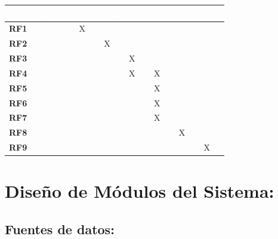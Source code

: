 \documentclass[12pt,a4paper]{article}
\begin{document}
                    \begin{table}[H]
                        \centering
                        \begin{tabularx}{\textwidth}{|X|p{1cm}|p{1cm}|p{1cm}|p{1cm}|p{1cm}|p{1cm}|}
                            \hline
                            \rowcolor{black} 
                            \textcolor{white}{Requerimiento} & \textcolor{white}{M.1} & \textcolor{white}{M.2} & \textcolor{white}{M.3} & \textcolor{white}{M.4} & \textcolor{white}{M.5} & \textcolor{white}{M.6}  \\ \hline
                            
                            \textbf{RF1} & X & & & & & \\ \hline
                            \textbf{RF2} & & X & & & & \\ \hline
                            \textbf{RF3} & & & X & & & \\ \hline
                            \textbf{RF4} & & & X & X & &  \\ \hline
                            \textbf{RF5} & & & & X & & \\ \hline
                            \textbf{RF6} & & & & X & & \\ \hline
                            \textbf{RF7} & & & & X &  & \\ \hline
                            \textbf{RF8} & & & &  & X & \\ \hline
                            \textbf{RF9} & & & &  &  & X \\ \hline
                        \end{tabularx}
                    \end{table}
    
    \section{Diseño de Módulos del Sistema:}
    \label{sec:modulos}
    \subsection{Fuentes de datos:}
\end{document}
